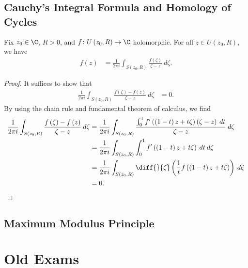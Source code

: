 \documentclass[10pt]{mypackage}
\begin{document}
\subsection{Cauchy's Integral Formula and Homology of Cycles}%
\begin{proposition}
  Fix $z_0\in \C$, $R > 0$, and $f\colon U\left( z_0,R \right)\rightarrow \C$ holomorphic. For all $z\in U\left( z_0,R \right)$, we have
  \begin{align*}
    f(z) &= \frac{1}{2\pi i} \int_{S\left( z_0,R \right)}^{} \frac{f\left( \zeta \right)}{\zeta - z}\:d\zeta.
  \end{align*}
\end{proposition}
\begin{proof}
  It suffices to show that
  \begin{align*}
    \frac{1}{2\pi i} \int_{S\left( z_0,R \right)}^{} \frac{f\left( \zeta \right)-f\left( z \right)}{\zeta - z}\:d\zeta &= 0.
  \end{align*}
  By using the chain rule and fundamental theorem of calculus, we find
  \begin{align*}
    \frac{1}{2\pi i} \int_{S\left( z_0,R \right)}^{} \frac{f\left( \zeta \right)-f\left( z \right)}{\zeta - z}\:d\zeta &= \frac{1}{2\pi i}\int_{S\left( z_0,R \right)}^{} \frac{ \int_{0}^{1} f'\left( \left( 1-t \right)z + t\zeta \right)\left( \zeta - z \right)\:dt }{\zeta - z}\:d\zeta\\
                                                                                                                       &= \frac{1}{2\pi i} \int_{S\left( z_0,R \right)}^{} \int_{0}^{1} f'\left( \left( 1-t \right)z + t\zeta \right)\:dt \:d\zeta\\
                                                                                                                       &= \frac{1}{2\pi i} \int_{S\left( z_0,R \right)}^{} \diff{}{\zeta}\left( \frac{1}{t}f\left( \left( 1-t \right)z + t\zeta \right) \right)\:d\zeta\\
                                                                                                                       &= 0.
  \end{align*}
\end{proof}
\subsection{Maximum Modulus Principle}%

\section{Old Exams}%
\end{document}
